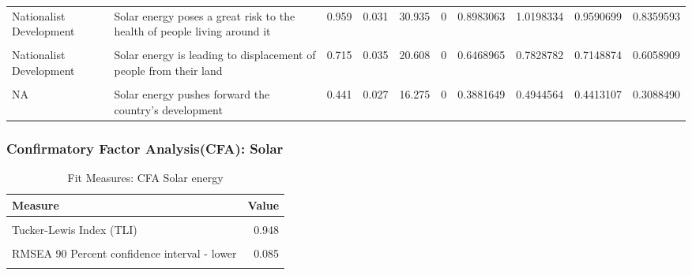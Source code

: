 \documentclass[
]{article}
\begin{document}
\begin{landscape}
\begin{landscape}
\begin{table}[!h]
{\begin{tabular}[t]{l>{\raggedright\arraybackslash}p{4cm}rrrrrrrr}
Nationalist Development & Solar energy poses a great risk to the health of people living around it & 0.959 & 0.031 & 30.935 & 0 & 0.8983063 & 1.0198334 & 0.9590699 & 0.8359593\\
\cellcolor{gray!6}{Nationalist Development} & \cellcolor{gray!6}{Solar energy spoils the natural beauty of the landscape} & \cellcolor{gray!6}{0.767} & \cellcolor{gray!6}{0.035} & \cellcolor{gray!6}{22.204} & \cellcolor{gray!6}{0} & \cellcolor{gray!6}{0.6995578} & \cellcolor{gray!6}{0.8350165} & \cellcolor{gray!6}{0.7672871} & \cellcolor{gray!6}{0.6434064}\\
Nationalist Development & Solar energy is leading to displacement of people from their land & 0.715 & 0.035 & 20.608 & 0 & 0.6468965 & 0.7828782 & 0.7148874 & 0.6058909\\
\cellcolor{gray!6}{NA} & \cellcolor{gray!6}{Solar energy increases pollution of air/water/land} & \cellcolor{gray!6}{0.991} & \cellcolor{gray!6}{0.033} & \cellcolor{gray!6}{30.450} & \cellcolor{gray!6}{0} & \cellcolor{gray!6}{0.9268425} & \cellcolor{gray!6}{1.0543652} & \cellcolor{gray!6}{0.9906038} & \cellcolor{gray!6}{0.8258675}\\
NA & Solar energy pushes forward the country's development & 0.441 & 0.027 & 16.275 & 0 & 0.3881649 & 0.4944564 & 0.4413107 & 0.3088490\\
\bottomrule
\end{tabular}}
\end{table}
\end{landscape}

\hypertarget{confirmatory-factor-analysiscfa-solar}{%
\subsubsection{Confirmatory Factor Analysis(CFA):
Solar}\label{confirmatory-factor-analysiscfa-solar}}

\begin{table}[!h]

\caption{\label{tab:unnamed-chunk-48}Fit Measures: CFA Solar energy}
\centering
\begin{tabular}[t]{lr}
\toprule
Measure & Value\\
\midrule
\cellcolor{gray!6}{Comparative Fit Index (CFI)} & \cellcolor{gray!6}{0.962}\\
Tucker-Lewis Index (TLI) & 0.948\\
\cellcolor{gray!6}{Root Mean Square Error of Approximation(RMSEA)} & \cellcolor{gray!6}{0.074}\\
RMSEA 90 Percent confidence interval - lower & 0.085\\
\cellcolor{gray!6}{RMSEA 90 Percent confidence interval - upper} & \cellcolor{gray!6}{0.065}\\
\bottomrule
\end{tabular}
\end{table}

\end{landscape}
\end{document}
